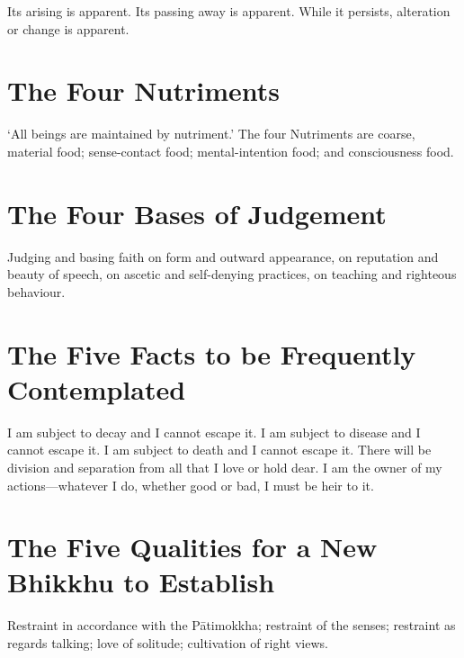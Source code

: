 Its arising is apparent. Its passing away is apparent. While it persists,
alteration or change is apparent.\\
\mbox{}

\section*{The Four Nutriments}

‘All beings are maintained by nutriment.’ The four Nutriments are coarse,
material food; sense-contact food; mental-intention food; and consciousness
food.\\
\mbox{}

\vspace*{-\baselineskip}

\section*{The Four Bases of Judgement}

Judging and basing faith on form and outward appearance, on reputation and
beauty of speech, on ascetic and self-denying practices, on teaching and
righteous behaviour.\\
\mbox{}

\vspace*{-\baselineskip}

\section*{The Five Facts to be Frequently Contemplated}

I am subject to decay and I cannot escape it. I am subject to disease and I
cannot escape it. I am subject to death and I cannot escape it. There will be
division and separation from all that I love or hold dear. I am the owner of my
actions—whatever I do, whether good or bad, I must be heir to it.\\
\mbox{}

\vspace*{-\baselineskip}

\section*{The Five Qualities for a New Bhikkhu to Establish}

Restraint in accordance with the Pātimokkha; restraint of the senses; restraint
as regards talking; love of solitude; cultivation of right views.


